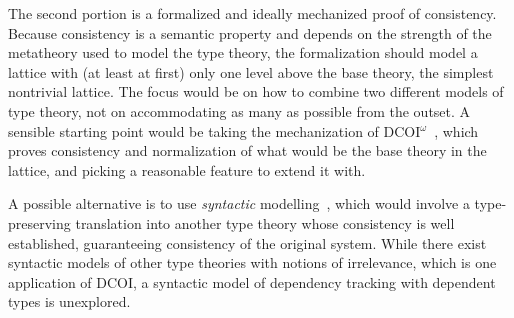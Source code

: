 \documentclass{article}
\begin{document}
The second portion is a formalized and ideally mechanized proof of consistency.
Because consistency is a semantic property and depends on the strength
of the metatheory used to model the type theory,
the formalization should model a lattice with (at least at first)
only one level above the base theory, the simplest nontrivial lattice.
The focus would be on how to combine two different models of type theory,
not on accommodating as many as possible from the outset.
A sensible starting point would be taking the mechanization of DCOI$^\omega$~\citep{dcoi-omega},
which proves consistency and normalization of what would be the base theory in the lattice,
and picking a reasonable feature to extend it with.

A possible alternative is to use \emph{syntactic} modelling~\citep{syntactic},
which would involve a type-preserving translation into another type theory
whose consistency is well established,
guaranteeing consistency of the original system.
While there exist syntactic models of other type theories \citep{sprop,ghosts}
with notions of irrelevance, which is one application of DCOI,
a syntactic model of dependency tracking with dependent types is unexplored.

\noindent

\end{document}

